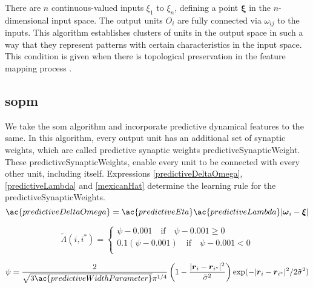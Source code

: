\documentclass[11pt,a4paper]{article}
\begin{document}
\begin{appendices}
There are $n$ continuous-valued inputs $\xi_1$ to $\xi_n$, defining a point $\boldsymbol{\xi}$ in the
$n$-dimensional input space.
The output units $O_i$ are fully connected via $\omega_{ij}$ to the inputs.
This algorithm establishes clusters of units in the output space in such a way
that they represent patterns with certain characteristics in the input space.
This condition is given when there is topological preservation
in the feature mapping process \cite{villmann97}.

\subsection{\ac{sopm}} \label{sopm}

We take the \ac{som} algorithm and incorporate predictive dynamical features to the same.
In this algorithm, every output unit has an additional set of synaptic weights,
which are called predictive synaptic weights \ac{predictiveSynapticWeight}.
These \ac{predictiveSynapticWeight}s, enable every unit to be connected
with every other unit, including itself.
Expressions  \ref{predictiveDeltaOmega}, \ref{predictiveLambda} and \ref{mexicanHat}
determine the learning rule for the \ac{predictiveSynapticWeight}s.\\

\begin{equation} \label{predictiveDeltaOmega}
\ac{predictiveDeltaOmega} = \ac{predictiveEta} \ac{predictiveLambda} |\boldsymbol{\omega}_i - \boldsymbol{\xi}|
\end{equation}

\begin{equation} \label{predictiveLambda}
\tilde{\Lambda}(i,i^*) = \begin{cases}
\psi - 0.001 \quad \text{if} \quad \psi - 0.001 \geq 0\\
0.1 (\psi - 0.001) \quad \text{if} \quad \psi - 0.001 < 0\\
\end{cases}
\end{equation}

\begin{equation} \label{mexicanHat}
\psi = \frac{2}{\sqrt{3\ac{predictiveWidthParameter}}\pi^{1/4}} \left( 1 - \frac{|\boldsymbol{r}_i - \boldsymbol{r}_{i^*}|^2}{\tilde{\sigma}^2} \right) \exp(-|\boldsymbol{r}_i - \boldsymbol{r}_{i^*}|^2 / 2 \tilde{\sigma}^2)
\end{equation}\\


\end{appendices}
\end{document}
